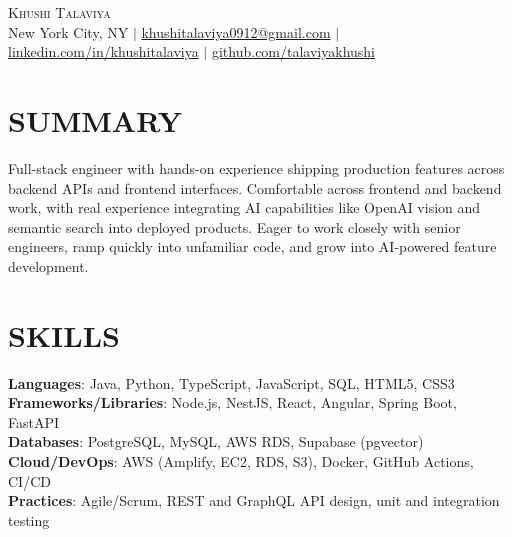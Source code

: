 \documentclass[letterpaper,11pt]{article}
\begin{document}
\begin{center}
    {\Huge \scshape Khushi Talaviya} \\ \vspace{2pt}
    \vspace{4pt}
    \small
    New York City, NY $|$
    \href{mailto:khushitalaviya0912@gmail.com}{khushitalaviya0912@gmail.com} $|$
    \href{https://www.linkedin.com/in/khushitalaviya/}{linkedin.com/in/khushitalaviya} $|$
    \href{https://github.com/talaviyakhushi}{github.com/talaviyakhushi}
\end{center}

\section{SUMMARY}
\vspace{5pt}
\small{Full-stack engineer with hands-on experience shipping production features across backend APIs and frontend interfaces. Comfortable across frontend and backend work, with real experience integrating AI capabilities like OpenAI vision and semantic search into deployed products. Eager to work closely with senior engineers, ramp quickly into unfamiliar code, and grow into AI-powered feature development.}

\vspace{2pt}
\section{SKILLS}
\vspace{5pt}
\begin{itemize}[leftmargin=0in, label={}]
\small{\item{
\textbf{Languages}{: Java, Python, TypeScript, JavaScript, SQL, HTML5, CSS3} \\
\textbf{Frameworks/Libraries}{: Node.js, NestJS, React, Angular, Spring Boot, FastAPI} \\
\textbf{Databases}{: PostgreSQL, MySQL, AWS RDS, Supabase (pgvector)} \\
\textbf{Cloud/DevOps}{: AWS (Amplify, EC2, RDS, S3), Docker, GitHub Actions, CI/CD} \\
\textbf{Practices}{: Agile/Scrum, REST and GraphQL API design, unit and integration testing}
}}
\end{itemize}
\vspace{-10pt}

\end{document}
